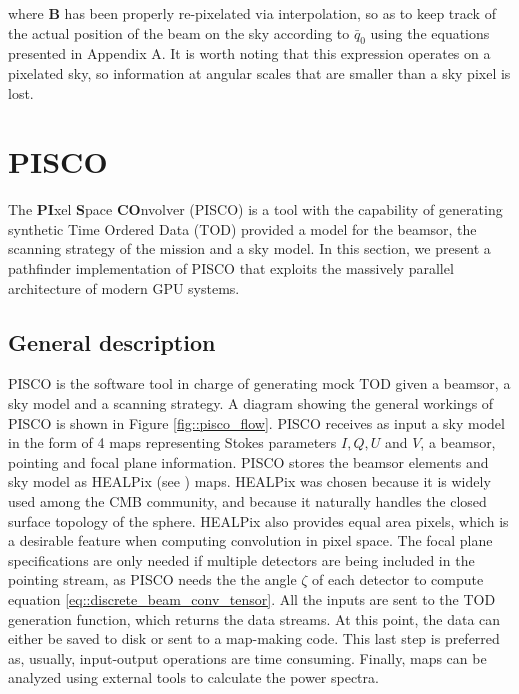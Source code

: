\documentclass[a4paper,11pt]{article}
\begin{document}
\noindent
where $\mathbf{B}$ has been properly re-pixelated via interpolation, so as to keep track of the actual position of the beam on the sky according to $\bar{q}_0$ using the equations presented in Appendix A. It is worth noting that this expression operates on a pixelated sky, so information at angular scales that are smaller than a sky pixel is lost.

\section{PISCO}
\label{sec::pisco}

The \textbf{PI}xel \textbf{S}pace \textbf{CO}nvolver (PISCO) is a tool with the capability of generating synthetic Time Ordered Data (TOD) provided a model for the beamsor, the scanning strategy of the mission and a sky model. In this section, we present a pathfinder implementation of PISCO that exploits the massively parallel architecture of modern GPU systems.

\subsection{General description}

PISCO is the software tool in charge of generating mock TOD given a beamsor, a sky model and a scanning strategy. A diagram showing the general workings of PISCO is shown in Figure \ref{fig::pisco_flow}. PISCO receives as input a sky model in the form of 4 maps representing Stokes parameters $I,Q,U$ and $V$, a beamsor, pointing and focal plane information. PISCO stores the beamsor elements and sky model as HEALPix (see \cite{2005ApJ...622..759G}) maps. HEALPix was chosen because it is widely used among the CMB community, and because it naturally handles the closed surface topology of the sphere. HEALPix also provides equal area pixels, which is a desirable feature when computing convolution in pixel space. The focal plane specifications are only needed if multiple detectors are being included in the pointing stream, as PISCO needs the the angle $\zeta$ of each detector to compute equation \ref{eq::discrete_beam_conv_tensor}. All the inputs are sent to the TOD generation function, which returns the data streams. At this point, the data can either be saved to disk or sent to a map-making code. This last step is preferred as, usually, input-output operations are time consuming. Finally, maps can be analyzed using external tools to calculate the power spectra.
\end{document}
